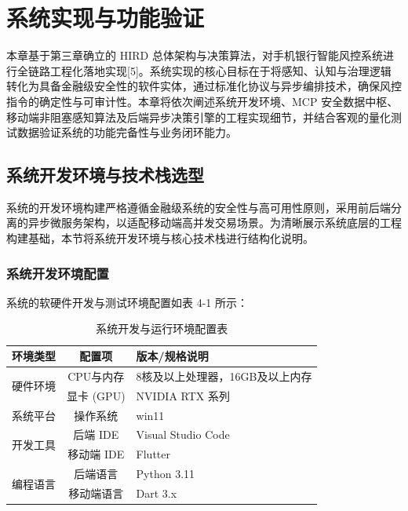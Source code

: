 \documentclass[twoside,openright]{xduugthesis}
\begin{document}
\chapter{系统实现与功能验证}

本章基于第三章确立的 HIRD 总体架构与决策算法，对手机银行智能风控系统进行全链路工程化落地实现[5]。系统实现的核心目标在于将感知、认知与治理逻辑转化为具备金融级安全性的软件实体，通过标准化协议与异步编排技术，确保风控指令的确定性与可审计性。本章将依次阐述系统开发环境、MCP 安全数据中枢、移动端非阻塞感知算法及后端异步决策引擎的工程实现细节，并结合客观的量化测试数据验证系统的功能完备性与业务闭环能力。

\section{系统开发环境与技术栈选型}

系统的开发环境构建严格遵循金融级系统的安全性与高可用性原则，采用前后端分离的异步微服务架构，以适配移动端高并发交易场景。为清晰展示系统底层的工程构建基础，本节将系统开发环境与核心技术栈进行结构化说明。

\subsection{系统开发环境配置}

系统的软硬件开发与测试环境配置如表 4-1 所示：

\begin{table}[H]
    \centering
    \caption{系统开发与运行环境配置表}
    \label{tab:dev-env}
    \begin{tabular}{|c|c|p{6cm}|}
        \hline
        环境类型 & 配置项 & 版本/规格说明 \\
        \hline
        \multirow{2}{*}{硬件环境} & CPU与内存 & 8核及以上处理器，16GB及以上内存 \\
        \cline{2-3}
        & 显卡 (GPU) & NVIDIA RTX 系列 \\
        \hline
        系统平台 & 操作系统 & win11 \\
        \hline
        \multirow{2}{*}{开发工具} & 后端 IDE & Visual Studio Code\\
        \cline{2-3}
        & 移动端 IDE & Flutter \\
        \hline
        \multirow{2}{*}{编程语言} & 后端语言 & Python 3.11\\
        \cline{2-3}
        & 移动端语言 & Dart 3.x\\
        \hline
    \end{tabular}
\end{table}
\end{document}
